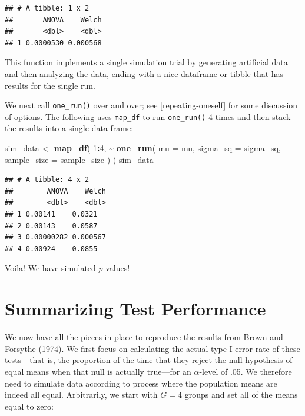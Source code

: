 \documentclass[
]{book}
\newenvironment{Shaded}{\begin{snugshade}}{\end{snugshade}}
\newcommand{\AttributeTok}[1]{\textcolor[rgb]{0.13,0.29,0.53}{#1}}
\newcommand{\DecValTok}[1]{\textcolor[rgb]{0.00,0.00,0.81}{#1}}
\newcommand{\FunctionTok}[1]{\textcolor[rgb]{0.13,0.29,0.53}{\textbf{#1}}}
\newcommand{\NormalTok}[1]{#1}
\newcommand{\OtherTok}[1]{\textcolor[rgb]{0.56,0.35,0.01}{#1}}
\newcommand{\SpecialCharTok}[1]{\textcolor[rgb]{0.81,0.36,0.00}{\textbf{#1}}}
\begin{document}
\begin{verbatim}
## # A tibble: 1 x 2
##       ANOVA    Welch
##       <dbl>    <dbl>
## 1 0.0000530 0.000568
\end{verbatim}

This function implements a single simulation trial by generating artificial data and then analyzing the data, ending with a nice dataframe or tibble that has results for the single run.

We next call \texttt{one\_run()} over and over; see \ref{repeating-oneself} for some discussion of options.
The following uses \texttt{map\_df} to run \texttt{one\_run()} 4 times and then stack the results into a single data frame:

\begin{Shaded}
\begin{Highlighting}[]
\NormalTok{sim\_data }\OtherTok{\textless{}{-}} \FunctionTok{map\_df}\NormalTok{(}
  \DecValTok{1}\SpecialCharTok{:}\DecValTok{4}\NormalTok{, }
  \SpecialCharTok{\textasciitilde{}} \FunctionTok{one\_run}\NormalTok{(}
      \AttributeTok{mu =}\NormalTok{ mu, }
      \AttributeTok{sigma\_sq =}\NormalTok{ sigma\_sq, }
      \AttributeTok{sample\_size =}\NormalTok{ sample\_size}
\NormalTok{    )}
\NormalTok{)}
\NormalTok{sim\_data}
\end{Highlighting}
\end{Shaded}

\begin{verbatim}
## # A tibble: 4 x 2
##        ANOVA    Welch
##        <dbl>    <dbl>
## 1 0.00141    0.0321  
## 2 0.00143    0.0587  
## 3 0.00000282 0.000567
## 4 0.00924    0.0855
\end{verbatim}

Voila! We have simulated \(p\)-values!

\section{Summarizing Test Performance}\label{summarizing-test-performance}

We now have all the pieces in place to reproduce the results from Brown and Forsythe (1974).
We first focus on calculating the actual type-I error rate of these tests---that is, the proportion of the time that they reject the null hypothesis of equal means when that null is actually true---for an \(\alpha\)-level of .05.
We therefore need to simulate data according to process where the population means are indeed all equal. Arbitrarily, we start with \(G = 4\) groups and set all of the means equal to zero:
\end{document}
